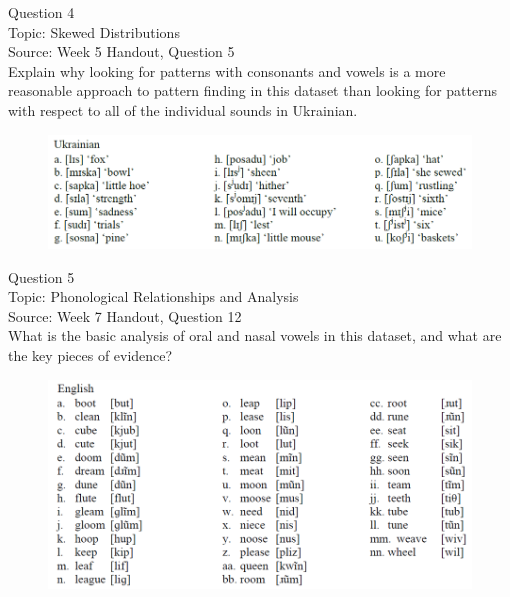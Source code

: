 \documentclass[12pt]{article}
\begin{document}
\newpage

{\large Question 4}\\

Topic: Skewed Distributions\\
Source: Week 5 Handout, Question 5\\

Explain why looking for patterns with consonants and vowels is a more reasonable approach to pattern finding in this dataset than looking for patterns with respect to all of the individual sounds in Ukrainian.\\

\begin{figure}[H]
\includegraphics{../images/ukrainian.png}
\end{figure}

\newpage

{\large Question 5}\\

Topic: Phonological Relationships and Analysis\\
Source: Week 7 Handout, Question 12\\

What is the basic analysis of oral and nasal vowels in this dataset, and what are the key pieces of evidence?\\

\begin{figure}[H]
\includegraphics{../images/english12.png}
\end{figure}
\end{document}
